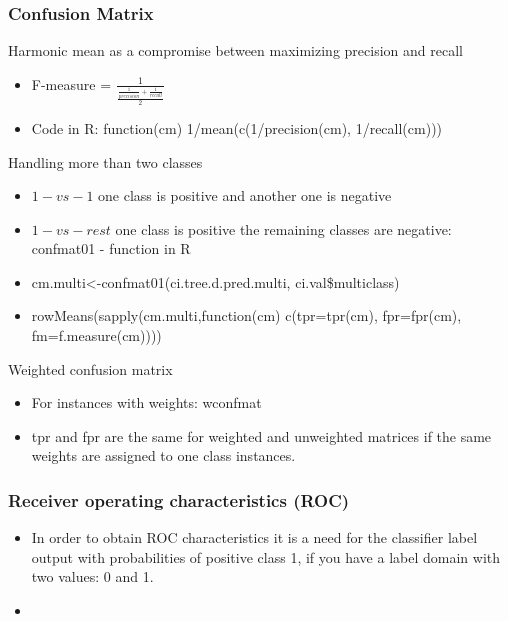 \documentclass[smaller, proffesionalfonts]{beamer}
\begin{document}
\begin{frame}
\frametitle{Confusion Matrix}
\begin{block}{Harmonic mean as a compromise between maximizing precision and recall}
\begin{itemize}
\item F-measure = $\frac{1}{\frac{\frac{1}{precision}+\frac{1}{recall}}{2}}$
\item Code in R: function(cm) { 1/mean(c(1/precision(cm), 1/recall(cm))) }
\end{itemize}
\end{block}
\begin{block}{Handling more than two classes}
\begin{itemize}
\item $1-vs-1$ one class is positive and another one is negative
\item $1-vs-rest$ one class is positive the remaining classes are negative: confmat01 - function in R
\item[\ ]
cm.multi<-confmat01(ci.tree.d.pred.multi, ci.val\$multiclass)
\item[\ ]
rowMeans(sapply(cm.multi,function(cm) c(tpr=tpr(cm), fpr=fpr(cm), fm=f.measure(cm))))
\end{itemize}
\end{block}
\begin{block}{Weighted confusion matrix}
\begin{itemize}
\item For instances with weights: wconfmat
\item tpr and fpr are the same for weighted and unweighted matrices if the same weights are assigned to one class instances.
\end{itemize}
\end{block}
\end{frame}

\begin{frame}
\small
\frametitle{Receiver operating characteristics (ROC)}
\begin{block}{}
\begin{itemize}
\item
In order to obtain ROC characteristics it is a need for the classifier label output with probabilities of positive class 1, if you have a label domain with two values: 0 and 1.  
\item[\ ]
\end{itemize}
\end{block}
\end{frame}
\end{document}
